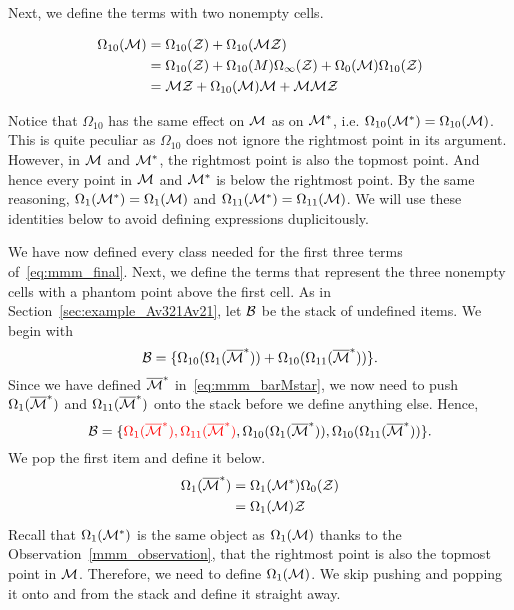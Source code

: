 \documentclass[12pt, a4paper, twoside]{report}
\begin{document}
Next, we define the terms with two nonempty cells.

\begin{align}
  \begin{aligned}
    \Omega_{10}(\mathcal{M}) &= \Omega_{10}(\mathcal{Z}) + \Omega_{10}(\mathcal{M}\mathcal{Z})\\
    &= \Omega_{10}(\mathcal{Z}) + \Omega_{10}(M)\Omega_\infty(\mathcal{Z}) + \Omega_0(\mathcal{M})\Omega_{10}(\mathcal{Z})\\
    &= \mathcal{M}\mathcal{Z} + \Omega_{10}(\mathcal{M})\mathcal{M} + \mathcal{M}\mathcal{M}\mathcal{Z}
  \end{aligned}
      \label{eq:mmm_omega10M}
\end{align}

\begin{observation}
\label{mmm_observation}
Notice that $\Omega_{10}$ has the same effect on $\mathcal{M}$ as on $\mathcal{M}^*$, i.e. $\Omega_{10}(\mathcal{M}^*) = \Omega_{10}(\mathcal{M})$. This is quite peculiar as $\Omega_{10}$ does not ignore the rightmost point in its argument. However, in $\mathcal{M}$ and $\mathcal{M}^*$, the rightmost point is also the topmost point. And hence every point in $\mathcal{M}$ and $\mathcal{M}^*$ is below the rightmost point. By the same reasoning, $\Omega_1(\mathcal{M}^*) = \Omega_1(\mathcal{M})$ and $\Omega_{11}(\mathcal{M}^*) = \Omega_{11}(\mathcal{M})$. We will use these identities below to avoid defining expressions duplicitously.
\end{observation}
We have now defined every class needed for the first three terms of~\eqref{eq:mmm_final}. Next, we define the terms that represent the three nonempty cells with a phantom point above the first cell. As in Section~\ref{sec:example_Av321Av21}, let $\mathcal{B}$ be the stack of undefined items. We begin with
$$\mathcal{B} = \{\Omega_{10}(\Omega_1(\overline{\mathcal{M}}^*)) + \Omega_{10}(\Omega_{11}(\overline{\mathcal{M}}^*))\}.$$
Since we have defined $\overline{\mathcal{M}}^*$ in~\eqref{eq:mmm_barMstar}, we now need to push $\Omega_1(\overline{\mathcal{M}}^*)$ and $\Omega_{11}(\overline{\mathcal{M}}^*)$ onto the stack before we define anything else. Hence,
$$\mathcal{B} = \{\textcolor{red}{\Omega_1(\overline{\mathcal{M}}^*), \Omega_{11}(\overline{\mathcal{M}}^*)}, \Omega_{10}(\Omega_1(\overline{\mathcal{M}}^*)), \Omega_{10}(\Omega_{11}(\overline{\mathcal{M}}^*))\}.$$
We pop the first item and define it below.
\begin{align}
  \begin{aligned}
  \Omega_1(\overline{\mathcal{M}}^*) &= \Omega_1(\mathcal{M}^*)\Omega_0(\mathcal{Z})\\
                      &=  \Omega_1(\mathcal{M})\mathcal{Z}
                    \end{aligned}
\end{align}
Recall that $\Omega_1(\mathcal{M}^*)$ is the same object as $\Omega_1(\mathcal{M})$ thanks to the Observation~\ref{mmm_observation}, that the rightmost point is also the topmost point in $\mathcal{M}$. Therefore, we need to define $\Omega_1(\mathcal{M})$. We skip pushing and popping it onto and from the stack and define it straight away.
\end{document}

